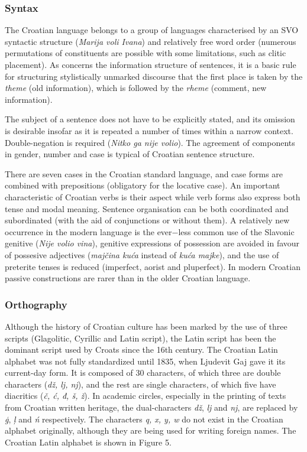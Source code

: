 \begin{multicols}{2}
\subsubsection{Syntax}

The Croatian language belongs to a group of languages characterised by an SVO syntactic structure (\emph{Marija voli Ivana}) and relatively free word order (numerous permutations of constituents are possible with some limitations, such as clitic placement). As concerns the information structure of sentences, it is a basic rule for structuring stylistically unmarked discourse that the first place is taken by the \emph{theme} (old information), which is followed by the \emph{rheme} (comment, new information).

The subject of a sentence does not have to be explicitly stated, and its omission is desirable insofar as it is repeated a number of times within a narrow context. Double-negation is required (\emph{Nitko ga nije volio}). The agreement of components in gender, number and case is typical of Croatian sentence structure.

There are seven cases in the Croatian standard language, and case forms are combined with prepositions (obligatory for the locative case). An important characteristic of Croatian verbs is their aspect while verb forms also express both tense and modal meaning. Sentence organisation can be both coordinated and subordinated (with the aid of conjunctions or without them). A relatively new occurrence in the modern language is the ever$-$less common use of the Slavonic genitive (\emph{Nije volio vina}), genitive expressions of possession are avoided in favour of possesive adjectives (\emph{majčina kuća} instead of \emph{kuća majke}), and the use of preterite tenses is reduced (imperfect, aorist and pluperfect). In modern Croatian passive constructions are rarer than in the older Croatian language.

\subsubsection{Orthography}

Although the history of Croatian culture has been marked by the use of three scripts (Glagolitic, Cyrillic and Latin script), the Latin script has been the dominant script used by Croats since the 16th century. The Croatian Latin alphabet was not fully standardized until 1835, when Ljudevit Gaj gave it its current-day form. It is composed of 30 characters, of which three are double characters (\emph{dž, lj, nj}), and the rest are single characters, of which five have diacritics (\emph{č, ć, đ, š, ž}). In academic circles, especially in the printing of texts from Croatian written heritage, the dual-characters \emph{dž}, \emph{lj} and \emph{nj}, are replaced by \emph{ģ}, \emph{ļ} and \emph{ń} respectively. The characters \emph{q, x, y, w} do not exist in the Croatian alphabet originally, although they are being used for writing foreign names. The Croatian Latin alphabet is shown in Figure 5. 


\end{multicols}
